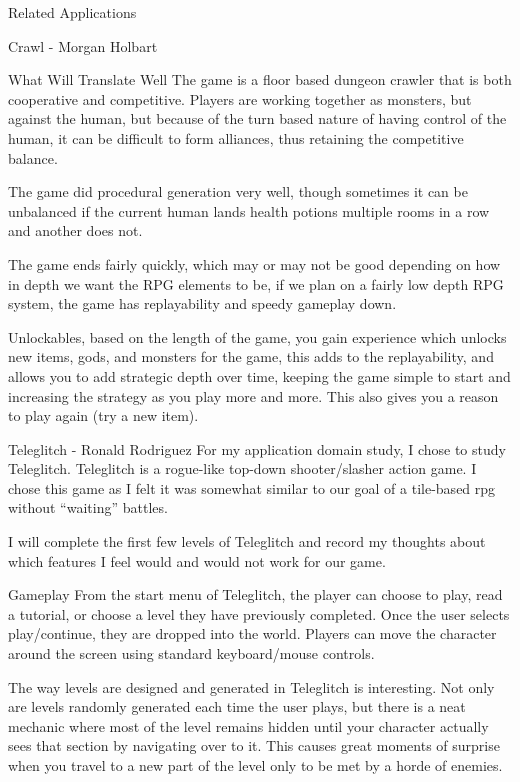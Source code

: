 \documentclass[12pt]{report}
\begin{document}
\begin{section}{Related Applications}
\begin{subsection}{Crawl - Morgan Holbart}
\begin{subsubsection}{What Will Translate Well}
The game is a floor based dungeon crawler that is both cooperative and
competitive. Players are working together as monsters, but against the
human, but because of the turn based nature of having control of the human,
it can be difficult to form alliances, thus retaining the competitive
balance. 

The game did procedural generation very well, though sometimes it can be
unbalanced if the current human lands health potions multiple rooms in a
row and another does not.

The game ends fairly quickly, which may or may not be good depending on how
in depth we want the RPG elements to be, if we plan on a fairly low depth
RPG system, the game has replayability and speedy gameplay down.

Unlockables, based on the length of the game, you gain experience which
unlocks new items, gods, and monsters for the game, this adds to the
replayability, and allows you to add strategic depth over time, keeping the
game simple to start and increasing the strategy as you play more and more.
This also gives you a reason to play again (try a new item).
\end{subsubsection}
\end{subsection}

\begin{subsection}{Teleglitch - Ronald Rodriguez}
For my application domain study, I chose to study Teleglitch. Teleglitch 
is a rogue-like top-down shooter/slasher action game. I chose this game 
as I felt it was somewhat similar to our goal of a tile-based rpg without 
``waiting'' battles.

I will complete the first few levels of Teleglitch and record my thoughts 
about which features I feel would and would not work for our 
game. 

\begin{subsubsection}{Gameplay}
From the start menu of Teleglitch, the player can choose to play, read a 
tutorial, or choose a level they have previously completed. Once the 
user selects play/continue, they are dropped into the world. Players can
move  the character around the screen using standard keyboard/mouse
controls. 

The way levels are designed and generated in Teleglitch is interesting. Not
only are levels randomly generated each time the user plays, but there is a
neat mechanic where most of the level remains hidden until your character 
actually sees that section by navigating over to it. This causes great 
moments of surprise when you travel to a new part of the level only to be 
met by a horde of enemies. 


\end{subsubsection}
\end{subsection}
\end{section}
\end{document}
